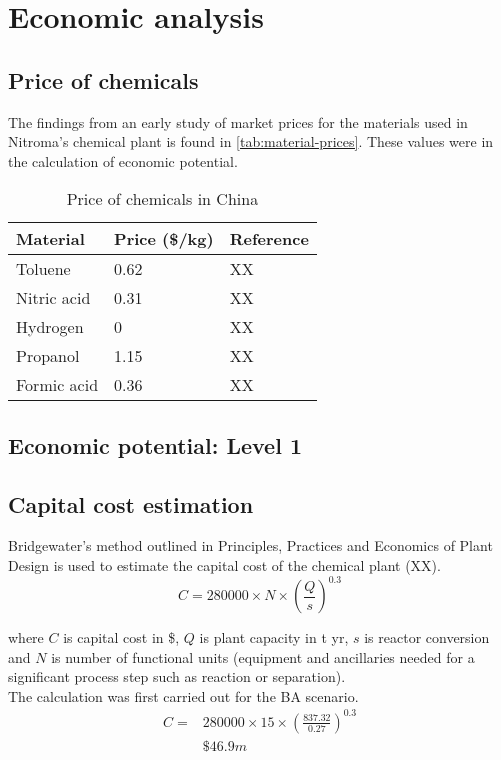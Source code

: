 \section{Economic analysis}
\label{app:economics}
\subsection{Price of chemicals}

The findings from an early study of market prices for the materials used in Nitroma's chemical plant is found in \cref{tab:material-prices}. These values were in the calculation of economic potential.

\begin{table}[h] %
\caption{Price of chemicals in China}
\label{material-prices}
\begin{tabular}{lll}
    \hline
    Material    & Price (\$/kg) & Reference \\ \hline
    Toluene     & 0.62          & XX        \\
    Nitric acid & 0.31          & XX        \\
    Hydrogen    & 0             & XX        \\
    Propanol    & 1.15          & XX        \\
    Formic acid & 0.36          & XX        \\ \hline
\end{tabular}
\end{table}

\subsection{Economic potential: Level 1}

\subsection{Capital cost estimation}

Bridgewater's method outlined in Principles, Practices and Economics of Plant Design is used to estimate the capital cost of the chemical plant (XX).
\begin{equation}
    C=280000 \times N \times (\frac{Q}{s})^0.3
\end{equation}

\noindent where $C$ is capital cost in \$, $Q$ is  plant capacity in t yr, $s$ is reactor conversion and $N$ is number of functional units (equipment and ancillaries needed for a significant process step such as reaction or separation).\\
The calculation was first carried out for the BA scenario.
\begin{equation}
\begin{split} 
C=& 280000 \times 15 \times (\frac{837.32}{0.27})^0.3  \\
 & \$46.9m 
\end{split}
\end{equation}
    
